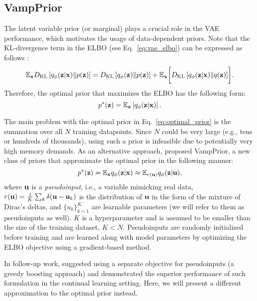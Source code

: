 \subsection{VampPrior}
The latent variable prior (or marginal) plays a crucial role in the VAE performance, which motivates the usage of data-dependent priors. 
Note that the KL-divergence term in the ELBO (see Eq.~\ref{eq:vae_elbo}) can be expressed as follows \citep{hoffman2016elbo}:
\begin{equation}
    \mathbb{E}_{{\mathbf{x}}} D_{\mathrm{KL}}\left[q_{\phi}({\mathbf{z}}|{\mathbf{x}})\|p({\mathbf{z}})\right] = D_{\mathrm{KL}}\left[q_{\phi}({\mathbf{z}})\| p({\mathbf{z}})\right] + \mathbb{E}_{{\mathbf{x}}} \biggl[ D_{\mathrm{KL}}\left[q_{\phi}({\mathbf{z}}|{\mathbf{x}})\|q({\mathbf{z}})\right] \biggr] .
\end{equation}
Therefore, the optimal prior that maximizes the ELBO has the following form:
\begin{equation}\label{eq:optimal_prior}
    p^*(\rvz) = \mathbb{E}_{\rvx} \left[ q_{\phi}(\rvz|\rvx) \right].
\end{equation}

The main problem with the optimal prior in Eq.~\ref{eq:optimal_prior} is the summation over all $N$ training datapoints. Since $N$ could be very large (e.g., tens or hundreds of thousands), using such a prior is infeasible due to potentially very high memory demands. As an alternative approach, \citet{tomczak2018vae} proposed VampPrior, a new class of priors that approximate the optimal prior in the following manner:
\begin{equation} \label{eq:vamp_prior_approx}
    p^*(\rvz) = \mathbb{E}_{\rvx} q_{\phi}(\rvz|\rvx) \approx \mathbb{E}_{r(\rvu)} q_{\phi}(\rvz|\rvu),
\end{equation}
where ${\mathbf{u}}$ is a \textit{pseudoinput}, i.e., a variable mimicking real data, $r({\mathbf{u}}) =\frac{1}{K}\sum_k \delta({\mathbf{u}} - {\mathbf{u}}_k)$ is the distribution of ${\mathbf{u}}$ in the form of the mixture of Dirac's deltas, and $\{u_k\}_{k=1}^K$ are learnable parameters (we will refer to them as pseudoinputs as well). $K$ is a hyperparameter and is assumed to be smaller than the size of the training dataset, $K < N$. Pseudoinputs are randomly initialized before training and are learned along with model parameters by optimizing the ELBO objective using a gradient-based method. 

In follow-up work, \citet{egorov2021boovae} suggested using a separate objective for pseudoinputs (a greedy boosting approach) and demonstrated the superior performance of such formulation in the continual learning setting. Here, we will present a different approximation to the optimal prior instead.

